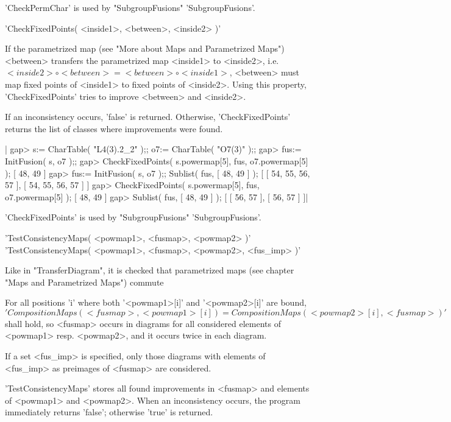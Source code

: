 'CheckPermChar' is used by "SubgroupFusions" 'SubgroupFusions'.


'CheckFixedPoints( <inside1>, <between>, <inside2> )'

If the parametrized map (see "More about Maps and Parametrized Maps")
<between> transfers the parametrized map <inside1> to <inside2>, i.e.\ 
$<inside2> \circ <between> = <between> \circ <inside1>$,
<between> must map fixed points of <inside1> to fixed points of <inside2>.
Using this property, 'CheckFixedPoints' tries to improve <between> and
<inside2>.

If an inconsistency occurs, 'false' is returned. Otherwise,
'CheckFixedPoints' returns the list of classes where improvements were found.

|    gap> s:= CharTable( "L4(3).2_2" );; o7:= CharTable( "O7(3)" );;
    gap> fus:= InitFusion( s, o7 );;
    gap> CheckFixedPoints( s.powermap[5], fus, o7.powermap[5] );
    [ 48, 49 ]
    gap> fus:= InitFusion( s, o7 );; Sublist( fus, [ 48, 49 ] );
    [ [ 54, 55, 56, 57 ], [ 54, 55, 56, 57 ] ]
    gap> CheckFixedPoints( s.powermap[5], fus, o7.powermap[5] );
    [ 48, 49 ]
    gap> Sublist( fus, [ 48, 49 ] );
    [ [ 56, 57 ], [ 56, 57 ] ]|

'CheckFixedPoints' is used by "SubgroupFusions" 'SubgroupFusions'.

\Section{TestConsistencyMaps}\index{subgroup fusions}

'TestConsistencyMaps( <powmap1>, <fusmap>, <powmap2> )'\\
'TestConsistencyMaps( <powmap1>, <fusmap>, <powmap2>, <fus\_imp> )'

Like in "TransferDiagram", it is checked that parametrized maps
(see chapter "Maps and Parametrized Maps") commute\:

For all positions 'i' where both '<powmap1>[i]' and '<powmap2>[i]'
are bound,
\[ 'CompositionMaps( <fusmap>, <powmap1>[i] ) =
 CompositionMaps( <powmap2>[i], <fusmap> )' \]
shall hold,
so <fusmap> occurs in diagrams for all considered elements of
<powmap1> resp. <powmap2>, and it occurs twice in each diagram.

If a set <fus\_imp> is specified, only those diagrams with
elements of <fus\_imp> as preimages of <fusmap> are considered.

'TestConsistencyMaps' stores all found improvements in <fusmap> and
elements of <powmap1> and <powmap2>.
When an inconsistency occurs, the program immediately returns 'false';
otherwise 'true' is returned.

